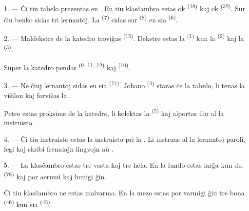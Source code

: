 \VUsaut{2.0mm}
\VUsaut{3.2mm}
\VUsaut{2.6mm}
\VUsaut{3.4mm}
\VUornamento{9pt}
\VUsaut{5.0mm}
\VUsaut{3.0mm}
\VUfilet{16mm}
\VUsaut{5.6mm}

\VUsaut{1.4mm}
\VUsaut{2.2mm}
\VUfilet{20mm}
\VUsaut{6.4mm}

\VUsaut{3.0mm}

1. --- Ĉi tiu tabelo prezentas  en . En
tiu klasĉambro estas ok  \textsuperscript{(18)} kaj ok
 \textsuperscript{(32)}. Sur ĉiu benko sidas tri lernantoj. La
 \textsuperscript{(7)} sidas sur 
\textsuperscript{(8)} en sia  \textsuperscript{(6)}.

2. --- Maldekstre de la katedro troviĝas  
\textsuperscript{(15)}. Dekstre estas la 
\textsuperscript{(1)} kun la  \textsuperscript{(2)} kaj la
 \textsuperscript{(3)}.

Super la katedro pendas  \textsuperscript{(9, 11, 12)}
kaj  \textsuperscript{(10)}.

3. --- Ne ĉiuj lernantoj sidas en sia  \textsuperscript{(17)}.
Johano \textsuperscript{(4)} staras ĉe la tabulo, li tenas la viŝilon kaj
forviŝas la .

Petro estas proksime de la katedro, li kolektas la 
\textsuperscript{(5)} kaj alportas ilin al la instruisto.

4. --- Ĉi tiu instruisto estas la instruisto pri la .
Li instruas al la lernantoj paroli, legi kaj skribi fremdajn lingvojn
 aŭ
.

5. --- La klasĉambro estas tre vasta kaj tre hela. En la fundo estas larĝa
 kun du  \textsuperscript{(78)} kaj
 por aerumi kaj lumigi ĝin.

Ĉi tiu klasĉambro ne estas malvarma. En la mezo estas por varmigi ĝin tre bona
 \textsuperscript{(46)} kun sia 
\textsuperscript{(45)}.

